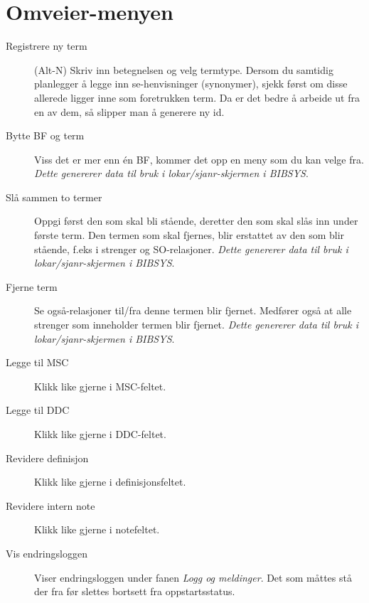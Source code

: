 \documentclass[a4paper,norsk,11pt]{article}
\begin{document}
\section{Omveier-menyen}
\begin{description}
\item[Registrere ny term] (Alt-N) Skriv inn betegnelsen og velg termtype. Dersom du samtidig planlegger  å legge inn se-henvisninger (synonymer), sjekk først om disse allerede ligger inne som foretrukken term. Da er det bedre å arbeide ut fra en av dem, så slipper man å generere ny id.
\item[Bytte BF og term] Viss det er mer enn én BF, kommer det opp en meny som du kan velge fra. \textit{Dette genererer data til bruk i lokar/sjanr-skjermen i BIBSYS}.
\item[Slå sammen to termer] Oppgi først den som skal bli stående, deretter den som skal slås inn under første term. Den termen som skal fjernes, blir erstattet av den som blir stående, f.eks i strenger og SO-relasjoner. \textit{Dette genererer data til bruk i lokar/sjanr-skjermen i BIBSYS}.
\item[Fjerne term] Se også-relasjoner til/fra denne termen blir fjernet. Medfører også at alle strenger som inneholder termen blir fjernet. \textit{ Dette genererer data til bruk i lokar/sjanr-skjermen i BIBSYS}.
\item[Legge til MSC] Klikk like gjerne i MSC-feltet.
\item[Legge til DDC]  Klikk like gjerne i DDC-feltet.
\item[Revidere definisjon] Klikk like gjerne i definisjonsfeltet.
\item[Revidere intern note] Klikk like gjerne i notefeltet.
\item[Vis endringsloggen] Viser endringsloggen under fanen \textit{Logg og meldinger}. Det som måttes stå der fra før slettes bortsett fra oppstartsstatus.
\end{description}
\end{document}
